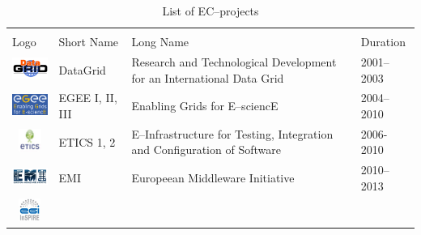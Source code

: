 \documentclass[journal]{IEEEtran}
\begin{document}
\begin{table}[!h]
\renewcommand{\arraystretch}{1.3}
\caption{List of EC--projects}
\label{tab:eup}
\centering
\begin{tabular}{p{1.6cm}p{1.5cm}p{3cm}l}
\hline
\hline
\\
Logo & Short Name & Long Name & Duration\\
\hline
\hline
\begin{minipage}{.3\textwidth}
\includegraphics[width=15mm,height=7.5mm]{images/datagrid}
\end{minipage}
    & DataGrid &
Research and Technological Development for an International Data Grid & 2001--2003\\
\begin{minipage}{.3\textwidth}
\includegraphics[width=15mm,height=7.5mm]{images/egee}
\end{minipage}
     & EGEE I, II, III &
Enabling Grids for E--sciencE & 2004--2010\\
\begin{minipage}{.3\textwidth}
\includegraphics[width=15mm,height=7.5mm]{images/etics}
\end{minipage}
     & ETICS 1, 2 &
E--Infrastructure for Testing, Integration and Configuration of Software & 2006-2010\\
\begin{minipage}{.3\textwidth}
\includegraphics[width=15mm,height=7.5mm]{images/emi}
\end{minipage}
     & EMI &
Europeean Middleware Initiative & 2010--2013\\
\begin{minipage}{.3\textwidth}
\includegraphics[width=15mm,height=7.5mm]{images/egi-inspire}

\end{minipage}
\end{tabular}
\end{table}
\end{document}
